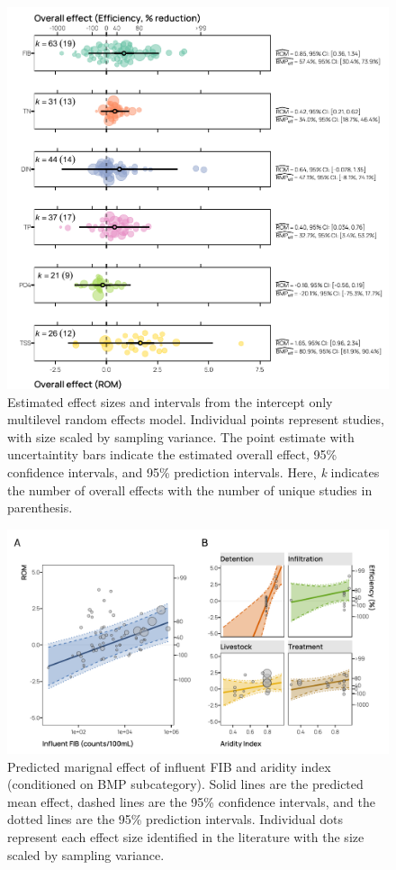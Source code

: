 \documentclass[utf8]{FrontiersinHarvard}
\begin{document}
\begin{figure}[p]
\includegraphics[width=1\linewidth,]{../figures/overall_effect} \caption{Estimated effect sizes and intervals from the intercept only multilevel random effects model. Individual points represent studies, with size scaled by sampling variance. The point estimate with uncertaintity bars indicate the estimated overall effect, 95\% confidence intervals, and 95\% prediction intervals. Here, \textit{k} indicates the number of overall effects with the number of unique studies in parenthesis.}\label{fig:overalleffect}
\end{figure}

\begin{figure}[p]
\includegraphics[width=1\linewidth,]{../figures/bac_predicted} \caption{Predicted marignal effect of influent FIB and aridity index (conditioned on BMP subcategory). Solid lines are the predicted mean effect, dashed lines are the 95\% confidence intervals, and the dotted lines are the 95\% prediction intervals. Individual dots represent each effect size identified in the literature with the size scaled by sampling variance.}\label{fig:fibeffect}
\end{figure}
\end{document}
